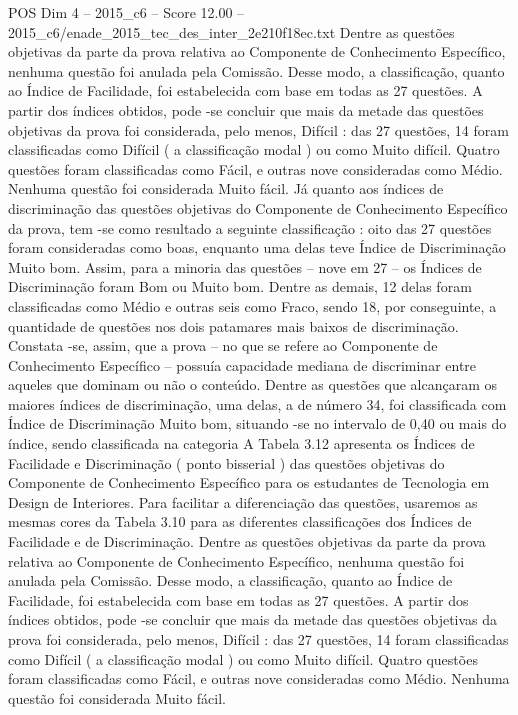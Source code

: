 \begin{textsample}{POS Dim 4 – 2015\_c6 – Score 12.00 – 2015\_c6/enade\_2015\_tec\_des\_inter\_2e210f18ec.txt}
Dentre as questões objetivas da parte da prova relativa ao Componente de Conhecimento Específico, nenhuma questão foi anulada pela Comissão.
Desse modo, a classificação, quanto ao Índice de Facilidade, foi estabelecida com base em todas as 27 questões.
A partir dos índices obtidos, pode -se concluir que mais da metade das questões objetivas da prova foi considerada, pelo menos, Difícil : das 27 questões, 14 foram classificadas como Difícil ( a classificação modal ) ou como Muito difícil.
Quatro questões foram classificadas como Fácil, e outras nove consideradas como Médio.
Nenhuma questão foi considerada Muito fácil.
Já quanto aos índices de discriminação das questões objetivas do Componente de Conhecimento Específico da prova, tem -se como resultado a seguinte classificação : oito das 27 questões foram consideradas como boas, enquanto uma delas teve Índice de Discriminação Muito bom.
Assim, para a minoria das questões – nove em 27 – os Índices de Discriminação foram Bom ou Muito bom.
Dentre as demais, 12 delas foram classificadas como Médio e outras seis como Fraco, sendo 18, por conseguinte, a quantidade de questões nos dois patamares mais baixos de discriminação.
Constata -se, assim, que a prova – no que se refere ao Componente de Conhecimento Específico – possuía capacidade mediana de discriminar entre aqueles que dominam ou não o conteúdo.
Dentre as questões que alcançaram os maiores índices de discriminação, uma delas, a de número 34, foi classificada com Índice de Discriminação Muito bom, situando -se no intervalo de 0,40 ou mais do índice, sendo classificada na categoria A Tabela 3.12 apresenta os Índices de Facilidade e Discriminação ( ponto bisserial ) das questões objetivas do Componente de Conhecimento Específico para os estudantes de Tecnologia em Design de Interiores.
Para facilitar a diferenciação das questões, usaremos as mesmas cores da Tabela 3.10 para as diferentes classificações dos Índices de Facilidade e de Discriminação.
Dentre as questões objetivas da parte da prova relativa ao Componente de Conhecimento Específico, nenhuma questão foi anulada pela Comissão.
Desse modo, a classificação, quanto ao Índice de Facilidade, foi estabelecida com base em todas as 27 questões.
A partir dos índices obtidos, pode -se concluir que mais da metade das questões objetivas da prova foi considerada, pelo menos, Difícil : das 27 questões, 14 foram classificadas como Difícil ( a classificação modal ) ou como Muito difícil.
Quatro questões foram classificadas como Fácil, e outras nove consideradas como Médio.
Nenhuma questão foi considerada Muito fácil.

\end{textsample}
